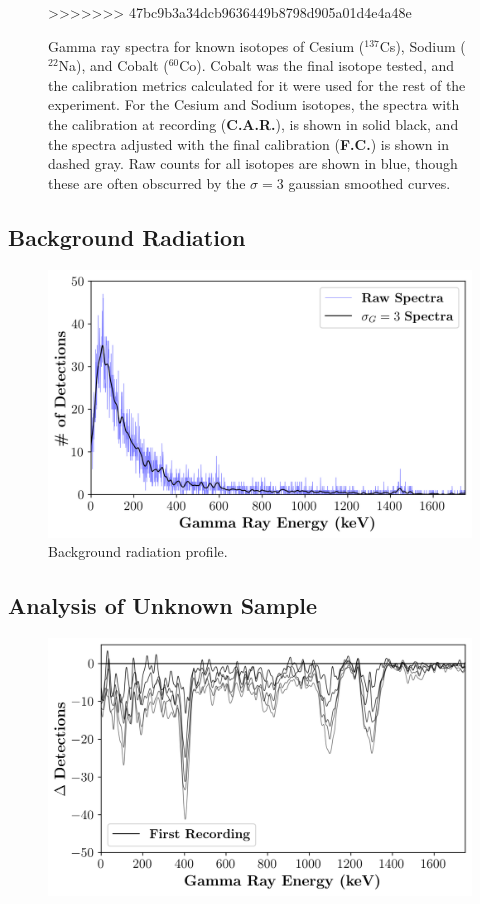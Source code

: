\documentclass[a4paper,twocolumn]{IEEEtran}
\begin{document}
\begin{figure}[H]
>>>>>>> 47bc9b3a34dcb9636449b8798d905a01d4e4a48e
        \caption{Gamma ray spectra for known isotopes of Cesium ($^{137}$Cs), Sodium ($^{22}$Na), and Cobalt ($^{60}$Co). Cobalt was the final isotope tested, and the calibration metrics calculated for it were used for the rest of the experiment. For the Cesium and Sodium isotopes, the spectra with the calibration at recording (\textbf{C.A.R.}), is shown in solid black, and the spectra adjusted with the final calibration (\textbf{F.C.}) is shown in dashed gray. Raw counts for all isotopes are shown in blue, though these are often obscurred by the $\sigma=3$ gaussian smoothed curves.}
    \end{figure}
    \subsection{Background Radiation}
    \begin{figure}[H]
        \centering
        \includegraphics[width=0.95\linewidth]{figures/background_counts_overlay.png}
        \caption{Background radiation profile.}
    \end{figure}
    \subsection{Analysis of Unknown Sample}
    \begin{figure}[H]
        \centering
        \includegraphics[width=0.95\linewidth]{figures/difference_counts_smooth.png}
    \end{figure}
\end{document}
